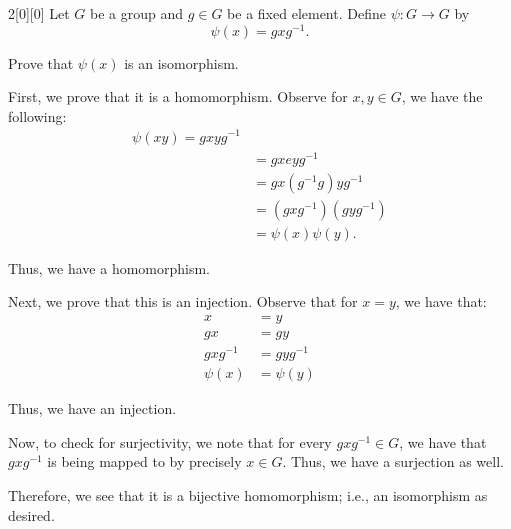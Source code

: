 \documentclass{article}
\begin{document}
\begin{hw}{2}[0][0]
	Let $G$ be a group and $g \in G$ be a fixed element. Define $\psi : G \rightarrow G$ by
	\begin{equation*}
		\psi(x) = gxg^{-1}.
	\end{equation*}

	Prove that $\psi(x)$ is an isomorphism.
\end{hw}
\begin{solution}
	First, we prove that it is a homomorphism. Observe for $x, y \in G$, we have the following:
	\begin{align*}
		\psi(xy) = gxyg^{-1} \\
		&= gxeyg^{-1} \\
		&= gx(g^{-1}g)yg^{-1} \\
		&= (gxg^{-1})(gyg^{-1}) \\
		&= \psi(x)\psi(y).
	\end{align*}

	Thus, we have a homomorphism.
	
	Next, we prove that this is an injection. Observe that for $x = y$, we have that:
	\begin{align*}
		x &= y \\
		gx &= gy \\
		gxg^{-1} &= gyg^{-1} \\
		\psi(x) &= \psi(y)
	\end{align*}

	Thus, we have an injection.
	
	Now, to check for surjectivity, we note that for every $gxg^{-1} \in G$, we have that $gxg^{-1}$ is being mapped to by precisely $x \in G$. Thus, we have a surjection as well.
	
	Therefore, we see that it is a bijective homomorphism; i.e., an isomorphism as desired.
\end{solution}
\end{document}
